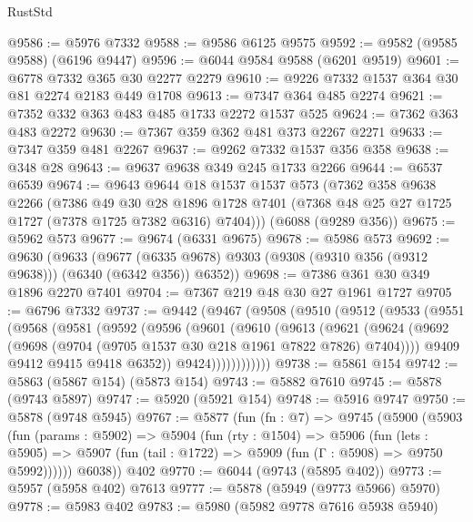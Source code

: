 \begin{lexlean}{RustStd}
\begin{coremodule}
@9586 := @5976 @7332
@9588 := @9586 @6125 @9575
@9592 := @9582 (@9585 @9588) (@6196 @9447)
@9596 := @6044 @9584 @9588 (@6201 @9519)
@9601 := @6778 @7332 @365 @30 @2277 @2279
@9610 := @9226 @7332 @1537 @364 @30 @81 @2274 @2183 @449 @1708
@9613 := @7347 @364 @485 @2274
@9621 := @7352 @332 @363 @483 @485 @1733 @2272 @1537 @525
@9624 := @7362 @363 @483 @2272
@9630 := @7367 @359 @362 @481 @373 @2267 @2271
@9633 := @7347 @359 @481 @2267
@9637 := @9262 @7332 @1537 @356 @358
@9638 := @348 @28
@9643 := @9637 @9638 @349 @245 @1733 @2266
@9644 := @6537 @6539
@9674 := @9643
    @9644
    @18
    @1537
    @1537
    @573
    (@7362
      @358
      @9638
      @2266
      (@7386
        @49
        @30
        @28
        @1896
        @1728
        @7401
        (@7368 @48 @25 @27 @1725 @1727 (@7378 @1725 @7382 @6316) @7404)))
    (@6088 (@9289 @356))
@9675 := @5962 @573
@9677 := @9674 (@6331 @9675)
@9678 := @5986 @573
@9692 := @9630
    (@9633
      (@9677 (@6335 @9678) @9303 (@9308 (@9310 @356 (@9312 @9638))) (@6340 (@6342 @356)) @6352))
@9698 := @7386 @361 @30 @349 @1896 @2270 @7401
@9704 := @7367 @219 @48 @30 @27 @1961 @1727
@9705 := @6796 @7332
@9737 := @9442
    (@9467
      (@9508
        (@9510
          (@9512
            (@9533
              (@9551
                (@9568
                  (@9581
                    (@9592
                      (@9596
                        (@9601
                          (@9610
                            (@9613
                              (@9621
                                (@9624
                                  (@9692
                                    (@9698 (@9704 (@9705 @1537 @30 @218 @1961 @7822 @7826) @7404))))
                                @9409
                                @9412
                                @9415
                                @9418
                                @6352))
                            @9424))))))))))))
@9738 := @5861 @154
@9742 := @5863 (@5867 @154) (@5873 @154)
@9743 := @5882 @7610
@9745 := @5878 (@9743 @5897)
@9747 := @5920 (@5921 @154)
@9748 := @5916 @9747
@9750 := @5878 (@9748 @5945)
@9767 := @5877
    (fun (fn : @7) =>
    @9745
      (@5900
        (@5903
          (fun (params : @5902) =>
          @5904
            (fun (rty : @1504) =>
            @5906
              (fun (lets : @5905) =>
              @5907 (fun (tail : @1722) => @5909 (fun (Γ : @5908) => @9750 @5992))))))
        @6038))
    @402
@9770 := @6044 (@9743 (@5895 @402))
@9773 := @5957 (@5958 @402) @7613
@9777 := @5878 (@5949 (@9773 @5966) @5970)
@9778 := @5983 @402
@9783 := @5980 (@5982 @9778 @7616 @5938 @5940)

\end{coremodule}
\end{lexlean}
